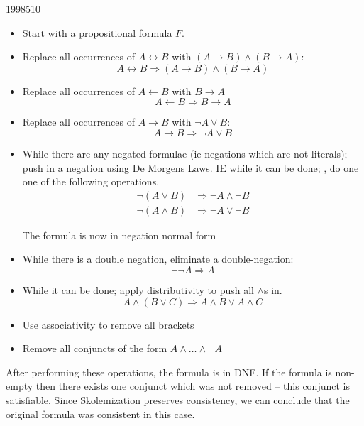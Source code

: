 \documentclass[10pt,\jkfside,a4paper]{article}
\begin{document}
\begin{examquestion}{1998}{5}{10}
\begin{enumerate}
\begin{itemize}
\item Start with a propositional formula $F$.

\item Replace all occurrences of $A \leftrightarrow B$ with $(A \to B) \wedge
(B \to A)$:
\[
A \leftrightarrow B \Rightarrow (A \to B) \wedge (B \to A)
\]

\item Replace all occurrences of $A \leftarrow B$ with $B \to A$
\[
A \leftarrow B \Rightarrow B \to A
\]

\item Replace all occurrences of $A \to B$ with $\neg A \vee B$:
\[
A \to B \Rightarrow \neg A \vee B
\]

\item While there are any negated formulae (ie negations which are not
literals); push in a negation using De Morgens Laws. IE while it can be done;
, do one one of the following operations.
\begin{align*}
\neg (A \vee B) &\Rightarrow \neg A \wedge \neg B \\
\neg (A \wedge B) &\Rightarrow \neg A \vee \neg B
\end{align*}

The formula is now in negation normal form

\item While there is a double negation, eliminate a double-negation:
\[
\neg \neg A \Rightarrow A
\]

\item While it can be done; apply distributivity to push all $\wedge$s in.
\[
A \wedge (B \vee C) \Rightarrow A \wedge B \vee A \wedge C
\]

\item Use associativity to remove all brackets

\item Remove all conjuncts of the form $A \wedge \dots \wedge \neg A$

\end{itemize}

After performing these operations, the formula is in DNF\@. If the formula
is non-empty then there exists one conjunct which was not removed -- this
conjunct is satisfiable. Since Skolemization preserves consistency, we can
conclude that the original formula was consistent in this case.

\end{enumerate}

\end{examquestion}
\end{document}
